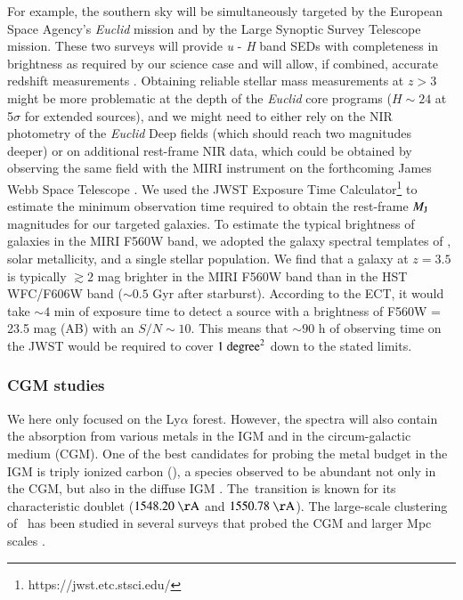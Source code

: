 \documentclass{aa}
\newcommand{\civ}{\ion{C}{iv}}
\begin{document}
For example, the southern sky will be simultaneously targeted by the European Space Agency's {\it Euclid} mission \citep{Laureijs2011} and by the Large Synoptic Survey Telescope \citep{LSST2009} mission. These two surveys will provide {\it u} - {\it H} band SEDs with completeness in brightness as required by our science case \citep{Rhodes2017} and will allow, if combined, accurate redshift measurements \citep{laigle19}. Obtaining reliable stellar mass measurements at $z>3$ might be more problematic at the depth of the \emph{Euclid} core programs ($H\sim 24$ at 5$\sigma$ for extended sources), and we might need to either rely on the NIR photometry of the \emph{Euclid} Deep fields (which should reach two magnitudes deeper) or on additional rest-frame NIR data, which could be obtained by observing the same field with the MIRI instrument \citep{Rieke2015} on the forthcoming James Webb Space Telescope \citep{Gardner2006}. We used the JWST Exposure Time Calculator\footnote{https://jwst.etc.stsci.edu/} \citep{Pontoppidan2016} to estimate the minimum observation time required to obtain the rest-frame $M_{\rm J}$
magnitudes for our targeted galaxies. To estimate the typical brightness of galaxies in the MIRI F560W band, we adopted the galaxy spectral templates of \citet{bruzual&charlot03}, solar metallicity, and a single stellar population. We find that a galaxy at $z = 3.5$ is typically  $\gtrsim 2$ mag brighter in the MIRI F560W band than in the HST WFC/F606W band ($\sim 0.5$ Gyr after starburst). According to the ECT, it would take $\sim 4$ min of exposure time to detect a source with a brightness of F560W = 23.5 mag (AB) with an $S/N \sim 10$. This means that $\sim 90$ h of observing time on the JWST would be required to cover $1~{\rm degree}^2$ down to the stated limits.

\subsubsection{CGM studies}
We here only focused on the Ly$\alpha$ forest. However, the spectra will also contain the absorption from various metals in the IGM and in the circum-galactic medium (CGM). One of the best candidates for probing the metal budget in the IGM is triply ionized carbon (\civ), a species observed to be abundant not only in the CGM, but also in the diffuse IGM \citep[e.g.][]{DOdorico2010,DOdorico2016}. The \civ\,transition is known for its characteristic doublet ($1548.20~\mathrm{\AA}$ and $1550.78~\mathrm{\AA}$). The large-scale clustering of \civ\, has been studied in several surveys that probed the CGM \citep{Adelberger2003,Turner2014} and larger Mpc scales \citep{Tytler2009,Blomqvist2018}. 
\end{document}

